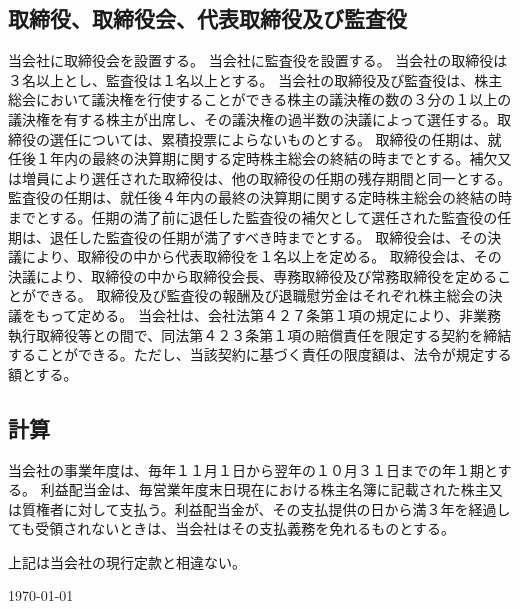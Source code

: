 \documentclass[10pt,a4paper,uplatex]{jsarticle}
\begin{document}
\subsection{取締役、取締役会、代表取締役及び監査役}
当会社に取締役会を設置する。
当会社に監査役を設置する。
当会社の取締役は３名以上とし、監査役は１名以上とする。
当会社の取締役及び監査役は、株主総会において議決権を行使することができる株主の議決権の数の３分の１以上の議決権を有する株主が出席し、その議決権の過半数の決議によって選任する。取締役の選任については、累積投票によらないものとする。
取締役の任期は、就任後１年内の最終の決算期に関する定時株主総会の終結の時までとする。補欠又は増員により選任された取締役は、他の取締役の任期の残存期間と同一とする。
監査役の任期は、就任後４年内の最終の決算期に関する定時株主総会の終結の時までとする。任期の満了前に退任した監査役の補欠として選任された監査役の任期は、退任した監査役の任期が満了すべき時までとする。
取締役会は、その決議により、取締役の中から代表取締役を１名以上を定める。
\term 取締役会は、その決議により、取締役の中から取締役会長、専務取締役及び常務取締役を定めることができる。
取締役及び監査役の報酬及び退職慰労金はそれぞれ株主総会の決議をもって定める。
当会社は、会社法第４２７条第１項の規定により、非業務執行取締役等との間で、同法第４２３条第１項の賠償責任を限定する契約を締結することができる。ただし、当該契約に基づく責任の限度額は、法令が規定する額とする。

\subsection{計算}
当会社の事業年度は、毎年１１月１日から翌年の１０月３１日までの年１期とする。
利益配当金は、毎営業年度末日現在における株主名簿に記載された株主又は質権者に対して支払う。利益配当金が、その支払提供の日から満３年を経過しても受領されないときは、当会社はその支払義務を免れるものとする。


\vspace{20pt}
上記は当会社の現行定款と相違ない。
\begin{flushleft} 
\today\\
\vspace{10pt}
\MakeSignatureField
\end{flushleft}
\end{document}
